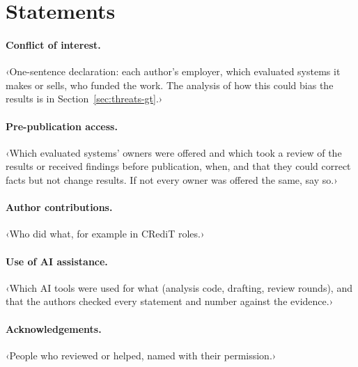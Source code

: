 \section*{Statements}
\label{sec:statements}
\paragraph{Conflict of interest.} ‹One-sentence declaration: each author's employer, which evaluated systems it makes or sells, who funded the work. The analysis of how this could bias the results is in Section~\ref{sec:threats-gt}.›
\paragraph{Pre-publication access.} ‹Which evaluated systems' owners were offered and which took a review of the results or received findings before publication, when, and that they could correct facts but not change results. If not every owner was offered the same, say so.›
\paragraph{Author contributions.} ‹Who did what, for example in CRediT roles.›
\paragraph{Use of AI assistance.} ‹Which AI tools were used for what (analysis code, drafting, review rounds), and that the authors checked every statement and number against the evidence.›
\paragraph{Acknowledgements.} ‹People who reviewed or helped, named with their permission.›
